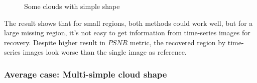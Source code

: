 \begin{figure}[h!]
	\centering
	\centering
	\caption{Some clouds with simple shape}
\end{figure}

The result shows that for small regions, both methods could work well, but for a large missing region, it's not easy to get information from time-series images for recovery. Despite higher result in $PSNR$ metric, the recovered region by time-series images look worse than the single image as reference.

\subsubsection{Average case: Multi-simple cloud shape}

